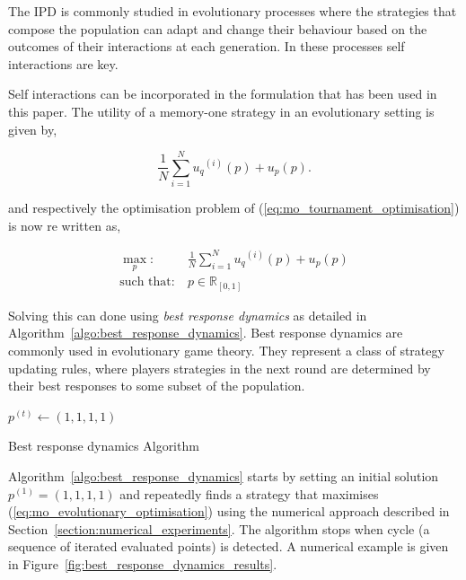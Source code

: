 \documentclass[10pt]{article}
\newcommand{\R}{\mathbb{R}}
\begin{document}
The IPD is commonly studied in evolutionary processes where the strategies that
compose the population can adapt and change their behaviour based on the
outcomes of their interactions at each generation. In these processes self
interactions are key.

Self interactions can be incorporated in the formulation that has been used
in this paper. The utility of a memory-one strategy in an evolutionary setting
is given by,

\begin{equation}
    \frac{1}{N} \sum\limits_{i=1} ^ {N} {u_q}^{(i)} (p) + u_p(p).
\end{equation}

and respectively the optimisation problem of (\ref{eq:mo_tournament_optimisation})
is now re written as,

\begin{equation}\label{eq:mo_evolutionary_optimisation}
    \begin{aligned}
    \max_p: & \ \frac{1}{N} \sum\limits_{i=1} ^ {N} {u_q}^{(i)} (p) + u_p(p)
    \\
    \text{such that}: & \ p \in \R_{[0, 1]}
    \end{aligned}
\end{equation}


Solving this can done using \textit{best response dynamics} as detailed in
Algorithm~\ref{algo:best_response_dynamics}. Best response dynamics are commonly
used in evolutionary game theory. They represent a class of
strategy updating rules, where players strategies in the next round are
determined by their best responses to some subset of the population.


\begin{algorithm}[H]
    $p^{(t)}\leftarrow (1, 1, 1, 1)$\;
    \caption{Best response dynamics Algorithm}
    \label{algo:best_response_dynamics}
\end{algorithm}

Algorithm~\ref{algo:best_response_dynamics} starts by setting an initial solution \(p^{(1)}=(1, 1, 1, 1)\) and
repeatedly finds a strategy that maximises
(\ref{eq:mo_evolutionary_optimisation}) using the numerical approach described
in Section~\ref{section:numerical_experiments}. The algorithm stops when cycle
(a sequence of iterated evaluated points) is detected. A numerical example is
given in Figure~\ref{fig:best_response_dynamics_results}.
\end{document}
